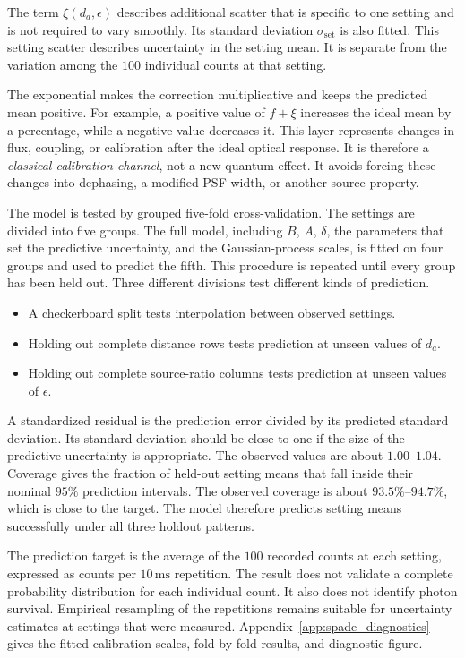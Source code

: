 The term $\xi(d_a,\epsilon)$ describes additional scatter that is specific to one setting and is not required to vary smoothly.  Its standard deviation $\sigma_{\mathrm{set}}$ is also fitted.  This setting scatter describes uncertainty in the setting mean.  It is separate from the variation among the $100$ individual counts at that setting.

The exponential makes the correction multiplicative and keeps the predicted mean positive.  For example, a positive value of $f+\xi$ increases the ideal mean by a percentage, while a negative value decreases it.  This layer represents changes in flux, coupling, or calibration after the ideal optical response.  It is therefore a \emph{classical calibration channel}, not a new quantum effect.  It avoids forcing these changes into dephasing, a modified PSF width, or another source property.

The model is tested by grouped five-fold cross-validation.  The settings are divided into five groups.  The full model, including $B$, $A$, $\delta$, the parameters that set the predictive uncertainty, and the Gaussian-process scales, is fitted on four groups and used to predict the fifth.  This procedure is repeated until every group has been held out.  Three different divisions test different kinds of prediction.
\begin{itemize}
    \item A checkerboard split tests interpolation between observed settings.
    \item Holding out complete distance rows tests prediction at unseen values of $d_a$.
    \item Holding out complete source-ratio columns tests prediction at unseen values of $\epsilon$.
\end{itemize}

A standardized residual is the prediction error divided by its predicted standard deviation.  Its standard deviation should be close to one if the size of the predictive uncertainty is appropriate.  The observed values are about $1.00$--$1.04$.  Coverage gives the fraction of held-out setting means that fall inside their nominal $95\%$ prediction intervals.  The observed coverage is about $93.5\%$--$94.7\%$, which is close to the target.  The model therefore predicts setting means successfully under all three holdout patterns.

The prediction target is the average of the $100$ recorded counts at each setting, expressed as counts per $10\,\mathrm{ms}$ repetition.  The result does not validate a complete probability distribution for each individual count.  It also does not identify photon survival.  Empirical resampling of the repetitions remains suitable for uncertainty estimates at settings that were measured.  Appendix~\ref{app:spade_diagnostics} gives the fitted calibration scales, fold-by-fold results, and diagnostic figure.

